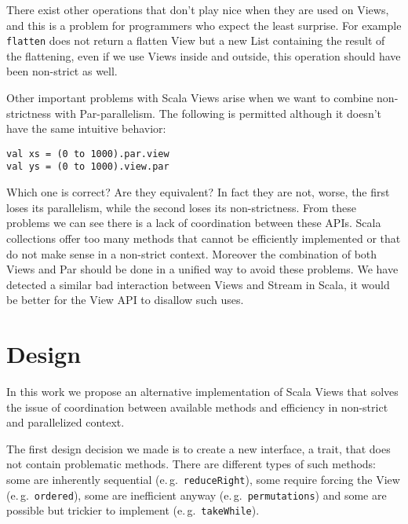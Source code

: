 \documentclass[a4paper,12pt,twocolumn]{article}
\newcommand{\eg}{e.\,g.\ }
\begin{document}
There exist other operations that don't play nice when they are used on Views, and this is a problem for programmers who expect the least surprise.
For example \verb|flatten| does not return a flatten View but a new List containing the result of the flattening, even if we use Views inside and outside, this operation should have been non-strict as well.

Other important problems with Scala Views arise when we want to combine non-strictness with Par-parallelism.
The following is permitted although it doesn't have the same intuitive behavior:

\begin{lstlisting}
val xs = (0 to 1000).par.view
val ys = (0 to 1000).view.par
\end{lstlisting}

Which one is correct? Are they equivalent? In fact they are not, worse, the first loses its parallelism, while the second loses its non-strictness.
From these problems we can see there is a lack of coordination between these APIs.
Scala collections offer too many methods that cannot be efficiently implemented or that do not make sense in a non-strict context.
Moreover the combination of both Views and Par should be done in a unified way to avoid these problems.
We have detected a similar bad interaction between Views and Stream in Scala, it would be better for the View API to disallow such uses.


\section{Design}
In this work we propose an alternative implementation of Scala Views that solves the issue of coordination between available methods and efficiency in non-strict and parallelized context.

The first design decision we made is to create a new interface, a trait, that does not contain problematic methods.
There are different types of such methods: some are inherently sequential (\eg \verb|reduceRight|), some require forcing the View (\eg \verb|ordered|), some are inefficient anyway (\eg \verb|permutations|) and some are possible but trickier to implement (\eg \verb|takeWhile|).
\end{document}
